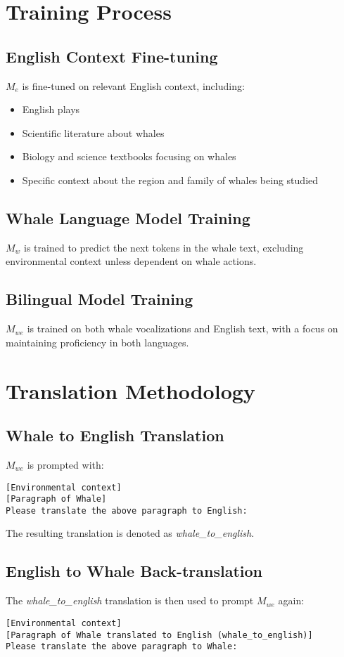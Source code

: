 \documentclass{article}
\begin{document}
\section{Training Process}
\subsection{English Context Fine-tuning}
$M_e$ is fine-tuned on relevant English context, including:
\begin{itemize}
    \item English plays
    \item Scientific literature about whales
    \item Biology and science textbooks focusing on whales
    \item Specific context about the region and family of whales being studied
\end{itemize}

\subsection{Whale Language Model Training}
$M_w$ is trained to predict the next tokens in the whale text, excluding environmental context unless dependent on whale actions.

\subsection{Bilingual Model Training}
$M_{we}$ is trained on both whale vocalizations and English text, with a focus on maintaining proficiency in both languages.

\section{Translation Methodology}
\subsection{Whale to English Translation}
$M_{we}$ is prompted with:
\begin{verbatim}
[Environmental context]
[Paragraph of Whale]
Please translate the above paragraph to English:
\end{verbatim}

The resulting translation is denoted as \textit{whale\_to\_english}.

\subsection{English to Whale Back-translation}
The \textit{whale\_to\_english} translation is then used to prompt $M_{we}$ again:
\begin{verbatim}
[Environmental context]
[Paragraph of Whale translated to English (whale_to_english)]
Please translate the above paragraph to Whale:
\end{verbatim}
\end{document}
